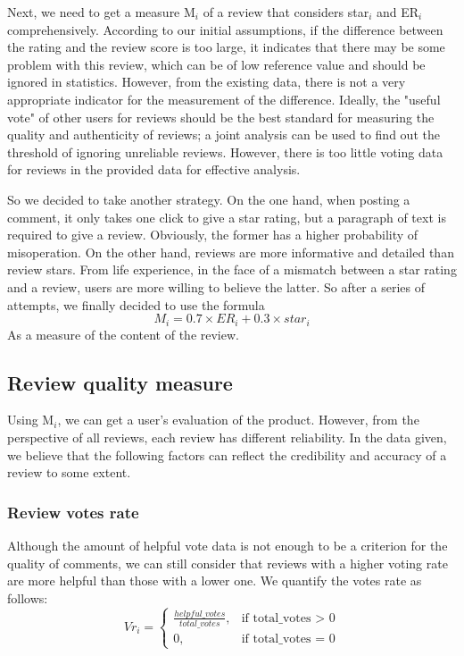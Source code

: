 \documentclass{mcmthesis}
\begin{document}
Next, we need to get a measure M$_{i}$ of a review that considers star$_{i}$ and ER$_{i}$ comprehensively.
According to our initial assumptions, if the difference between the rating and the review score is too large, it indicates that there may be some problem with this review, which can be of low reference value and should be ignored in statistics. However, from the existing data, there is not a very appropriate indicator for the measurement of the difference. Ideally, the "useful vote" of other users for reviews should be the best standard for measuring the quality and authenticity of reviews; a joint analysis can be used to find out the threshold of ignoring unreliable reviews. However, there is too little voting data for reviews in the provided data for effective analysis. 

So we decided to take another strategy. On the one hand, when posting a comment, it only takes one click to give a star rating, but a paragraph of text is required to give a review. Obviously, the former has a higher probability of misoperation. On the other hand, reviews are more informative and detailed than review stars. From life experience, in the face of a mismatch between a star rating and a review, users are more willing to believe the latter. So after a series of attempts, we finally decided to use the formula
\[
	M_{i} = 0.7 \times ER_{i} + 0.3 \times star_{i}
\]
As a measure of the content of the review.

\subsection{Review quality measure}
Using M$_{i}$, we can get a user's evaluation of the product. However, from the perspective of all reviews, each review has different reliability. In the data given, we believe that the following factors can reflect the credibility and accuracy of a review to some extent.

\subsubsection{Review votes rate}
Although the amount of helpful vote data is not enough to be a criterion for the quality of comments, we can still consider that reviews with a higher voting rate are more helpful than those with a lower one. We quantify the votes rate as follows:
\[
Vr_{i} = \begin{cases}  
\frac{helpful\_votes}{total\_votes}, & \text{if total\_votes > 0} \\
0, & \text{if total\_votes = 0}
\end{cases}
\]
\end{document}
